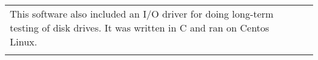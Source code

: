 \documentclass[10pt]{article}
\begin{document}
\begin{longtable}{p{91pt}p{390pt}}
{                          This software also included an I/O driver for doing long-term testing of disk drives. It was written in C
                          and ran on Centos Linux.
                              }\\
                      \\
\end{longtable}
\newpage

\end{document}
